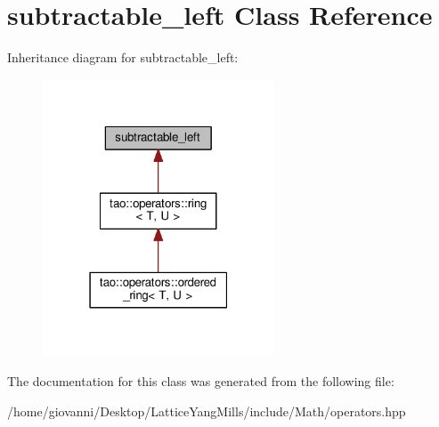 \hypertarget{classsubtractable__left}{}\section{subtractable\+\_\+left Class Reference}
\label{classsubtractable__left}


Inheritance diagram for subtractable\+\_\+left\+:\nopagebreak
\begin{figure}[H]
\begin{center}
\leavevmode
\includegraphics[width=195pt]{classsubtractable__left__inherit__graph}
\end{center}
\end{figure}


The documentation for this class was generated from the following file\+:\begin{DoxyCompactItemize}
\item 
/home/giovanni/\+Desktop/\+Lattice\+Yang\+Mills/include/\+Math/operators.\+hpp\end{DoxyCompactItemize}
